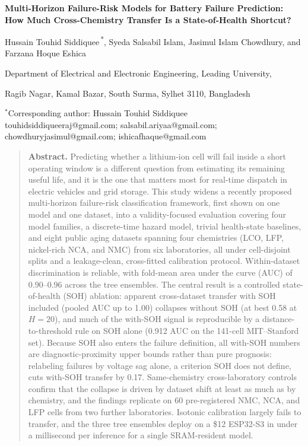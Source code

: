 \documentclass[11pt,a4paper]{article}
\begin{document}
\begin{center}
  {\LARGE\bfseries Multi-Horizon Failure-Risk Models for Battery Failure
   Prediction: How Much Cross-Chemistry Transfer Is a State-of-Health
   Shortcut?\par}
  \vspace{1.6em}
  {\normalsize Hussain Touhid Siddiquee\textsuperscript{\,*},
   Syeda Salsabil Islam,
   Jasimul Islam Chowdhury, and
   Farzana Hoque Eshica\par}
  \vspace{0.9em}
  {\small Department of Electrical and Electronic Engineering, Leading University,\par
   Ragib Nagar, Kamal Bazar, South Surma, Sylhet 3110, Bangladesh\par}
  \vspace{0.7em}
  {\small $^{*}$Corresponding author: Hussain Touhid Siddiquee\\
   \mbox{touhidsiddiqueeraj@gmail.com}; \mbox{salsabil.ariyaa@gmail.com};\\
   \mbox{chowdhuryjasimul@gmail.com}; \mbox{ishicafhaque@gmail.com}\par}
\end{center}

\vspace{1.4em}

\begin{quote}\small
\textbf{Abstract.} Predicting whether a lithium-ion cell will fail inside a short operating window is a different question from estimating its remaining useful life, and it is the one that matters most for real-time dispatch in electric vehicles and grid storage. This study widens a recently proposed multi-horizon failure-risk classification framework, first shown on one model and one dataset, into a validity-focused evaluation covering four model families, a discrete-time hazard model, trivial health-state baselines, and eight public aging datasets spanning four chemistries (LCO, LFP, nickel-rich NCA, and NMC) from six laboratories, all under cell-disjoint splits and a leakage-clean, cross-fitted calibration protocol. Within-dataset discrimination is reliable, with fold-mean area under the curve (AUC) of 0.90--0.96 across the tree ensembles. The central result is a controlled state-of-health (SOH) ablation: apparent cross-dataset transfer with SOH included (pooled AUC up to 1.00) collapses without SOH (at best 0.58 at $H{=}20$), and much of the with-SOH signal is reproducible by a distance-to-threshold rule on SOH alone (0.912 AUC on the 141-cell MIT--Stanford set). Because SOH also enters the failure definition, all with-SOH numbers are diagnostic-proximity upper bounds rather than pure prognosis: relabeling failures by voltage sag alone, a criterion SOH does not define, cuts with-SOH transfer by 0.17. Same-chemistry cross-laboratory controls confirm that the collapse is driven by dataset shift at least as much as by chemistry, and the findings replicate on 60 pre-registered NMC, NCA, and LFP cells from two further laboratories. Isotonic calibration largely fails to transfer, and the three tree ensembles deploy on a \$12 ESP32-S3 in under a millisecond per inference for a single SRAM-resident model.
\end{quote}
\end{document}
